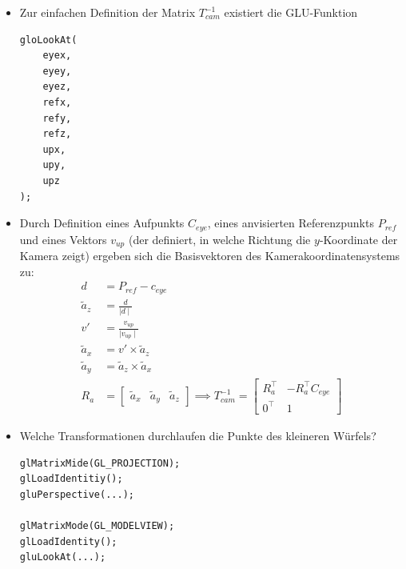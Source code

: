 \documentclass{scrartcl}
\begin{document}
\begin{itemize}
	\item Zur einfachen Definition der Matrix $T_{cam}^{-1}$ existiert die GLU-Funktion
	\begin{lstlisting}
gloLookAt(
	eyex,
	eyey,
	eyez,
	refx,
	refy,
	refz,
	upx,
	upy,
	upz
);
	\end{lstlisting}
	\item Durch Definition eines Aufpunkts $C_{eye}$, eines anvisierten Referenzpunkts $P_{ref}$ und eines Vektors $v_{up}$ (der definiert, in welche Richtung die $y$-Koordinate der Kamera zeigt) ergeben sich die Basisvektoren des Kamerakoordinatensystems zu:
	\begin{equation}
		\begin{split}
			d &= P_{ref} - c_{eye} \\
			\widetilde{a}_z &= \frac{d}{\mid d \mid} \\
			v' &= \frac{v_{up}}{\mid v_{up} \mid} \\
			\widetilde{a}_x &= v' \times \widetilde{a}_z \\
			\widetilde{a}_y &= \widetilde{a}_z \times \widetilde{a}_x \\
			R_a &= \begin{bmatrix}
			\widetilde{a}_x & \widetilde{a}_y & \widetilde{a}_z
			\end{bmatrix} \implies T_{cam}^{-1} = \begin{bmatrix}
			R_a^\top & -R_a^\top C_{eye} \\
			0^\top & 1
			\end{bmatrix}
		\end{split}
	\end{equation}
	\item Welche Transformationen durchlaufen die Punkte des kleineren Würfels? \\
	\begin{minipage}{.5\textwidth}
		\begin{lstlisting}
glMatrixMide(GL_PROJECTION);
glLoadIdentitiy();
gluPerspective(...);

glMatrixMode(GL_MODELVIEW);
glLoadIdentity();
gluLookAt(...);


\end{lstlisting}
\end{minipage}
\end{itemize}
\end{document}
